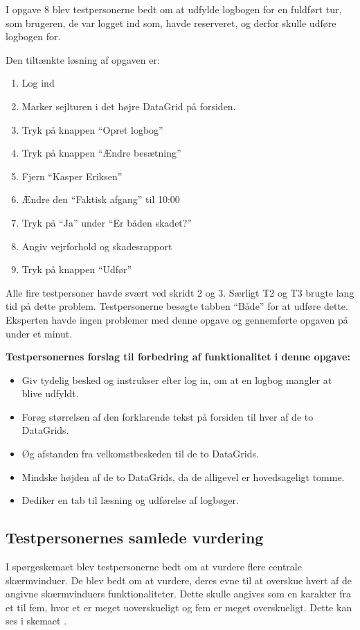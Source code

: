 I opgave 8 blev testpersonerne bedt om at udfylde logbogen for en fuldført tur, som brugeren, de var logget ind som, havde reserveret, og derfor skulle udføre logbogen for.

Den tiltænkte løsning af opgaven er:
\begin{enumerate}
    \item Log ind
    \item Marker sejlturen i det højre DataGrid på forsiden.
    \item Tryk på knappen ``Opret logbog''
    \item Tryk på knappen ``Ændre besætning''
    \item Fjern ``Kasper Eriksen''
    \item Ændre den ``Faktisk afgang'' til 10:00
    \item Tryk på ``Ja'' under ``Er båden skadet?''
    \item Angiv vejrforhold og skadesrapport
    \item Tryk på knappen ``Udfør''
\end{enumerate}

Alle fire testpersoner havde svært ved skridt 2 og 3.
Særligt T2 og T3 brugte lang tid på dette problem.
Testpersonerne besøgte tabben ``Både'' for at udføre dette. 
Eksperten havde ingen problemer med denne opgave og gennemførte opgaven på under et minut.

\textbf{Testpersonernes forslag til forbedring af funktionalitet i denne opgave:}
\begin{itemize}
    \item Giv tydelig besked og instrukser efter log in, om at en logbog mangler at blive udfyldt.
    \item Forøg størrelsen af den forklarende tekst på forsiden til hver af de to DataGrids.
    \item Øg afstanden fra velkomstbeskeden til de to DataGrids.
    \item Mindske højden af de to DataGrids, da de alligevel er hovedsageligt tomme. 
    \item Dediker en tab til læsning og udførelse af logbøger. 
\end{itemize}

\subsection{Testpersonernes samlede vurdering}

I spørgeskemaet blev testpersonerne bedt om at vurdere flere centrale skærmvinduer.
De blev bedt om at vurdere, deres evne til at overskue hvert af de angivne skærmvinduers funktionaliteter.
Dette skulle angives som en karakter fra et til fem, hvor et er meget uoverskueligt og fem er meget overskueligt.
Dette kan ses i skemaet .

